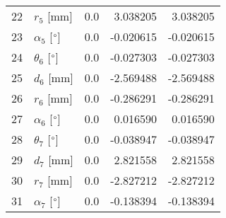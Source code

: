 \documentclass{standalone}%
\begin{document}
\begin{tabular}{llrrr}
22 &              $r_{5}$ [mm] &       0.0 &   3.038205 &   3.038205 \\
23 &  $\alpha_{5}$ [$\degree$] &       0.0 &  -0.020615 &  -0.020615 \\
24 &  $\theta_{6}$ [$\degree$] &       0.0 &  -0.027303 &  -0.027303 \\
25 &              $d_{6}$ [mm] &       0.0 &  -2.569488 &  -2.569488 \\
26 &              $r_{6}$ [mm] &       0.0 &  -0.286291 &  -0.286291 \\
27 &  $\alpha_{6}$ [$\degree$] &       0.0 &   0.016590 &   0.016590 \\
28 &  $\theta_{7}$ [$\degree$] &       0.0 &  -0.038947 &  -0.038947 \\
29 &              $d_{7}$ [mm] &       0.0 &   2.821558 &   2.821558 \\
30 &              $r_{7}$ [mm] &       0.0 &  -2.827212 &  -2.827212 \\
31 &  $\alpha_{7}$ [$\degree$] &       0.0 &  -0.138394 &  -0.138394 \\
\bottomrule
\end{tabular}
%
\end{document}
